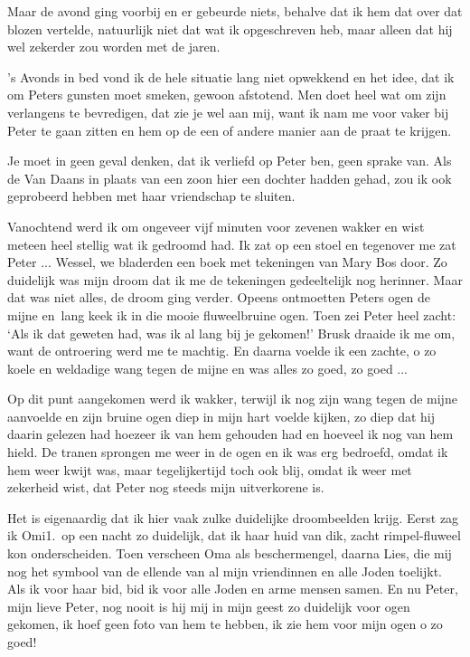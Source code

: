 \documentclass{book}
\begin{document}
Maar de avond ging voorbij en er gebeurde niets, behalve dat ik hem dat over dat
blozen vertelde, natuurlijk niet dat wat ik opgeschreven heb, maar alleen dat
hij wel zekerder zou worden met de jaren.

's Avonds in bed vond ik de hele situatie lang niet opwekkend en het idee, dat
ik om Peters gunsten moet smeken, gewoon afstotend. Men doet heel wat om zijn
verlangens te bevredigen, dat zie je wel aan mij, want ik nam me voor vaker bij
Peter te gaan zitten en hem op de een of andere manier aan de praat te krijgen.

Je moet in geen geval denken, dat ik verliefd op Peter ben, geen sprake van. Als
de Van Daans in plaats van een zoon hier een dochter hadden gehad, zou ik ook
geprobeerd hebben met haar vriendschap te sluiten.

Vanochtend werd ik om ongeveer vijf minuten voor zevenen wakker en wist meteen
heel stellig wat ik gedroomd had. Ik zat op een stoel en tegenover me zat Peter
... Wessel, we bladerden een boek met tekeningen van Mary Bos door. Zo duidelijk
was mijn droom dat ik me de tekeningen gedeeltelijk nog herinner. Maar dat was
niet alles, de droom ging verder. Opeens ontmoetten Peters ogen de mijne en~lang
keek ik in die mooie fluweelbruine ogen. Toen zei Peter heel zacht: `Als ik dat
geweten had, was ik al lang bij je gekomen!' Brusk draaide ik me om, want de
ontroering werd me te machtig. En daarna voelde ik een zachte, o zo koele en
weldadige wang tegen de mijne en was alles zo goed, zo goed ...

Op dit punt aangekomen werd ik wakker, terwijl ik nog zijn wang tegen de mijne
aanvoelde en zijn bruine ogen diep in mijn hart voelde kijken, zo diep dat hij
daarin gelezen had hoezeer ik van hem gehouden had en hoeveel ik nog van hem
hield. De tranen sprongen me weer in de ogen en ik was erg bedroefd, omdat ik
hem weer kwijt was, maar tegelijkertijd toch ook blij, omdat ik weer met
zekerheid wist, dat Peter nog steeds mijn uitverkorene is.

Het is eigenaardig dat ik hier vaak zulke duidelijke droombeelden krijg.  Eerst
zag ik Omi1.~op een nacht zo duidelijk, dat ik haar huid van dik, zacht
rimpel-fluweel kon onderscheiden. Toen verscheen Oma als beschermengel, daarna
Lies, die mij nog het symbool van de ellende van al mijn vriendinnen en alle
Joden toelijkt. Als ik voor haar bid, bid ik voor alle Joden en arme mensen
samen. En nu Peter, mijn lieve Peter, nog nooit is hij mij in mijn geest zo
duidelijk voor ogen gekomen, ik hoef geen foto van hem te hebben, ik zie hem
voor mijn ogen o zo goed!
\end{document}
